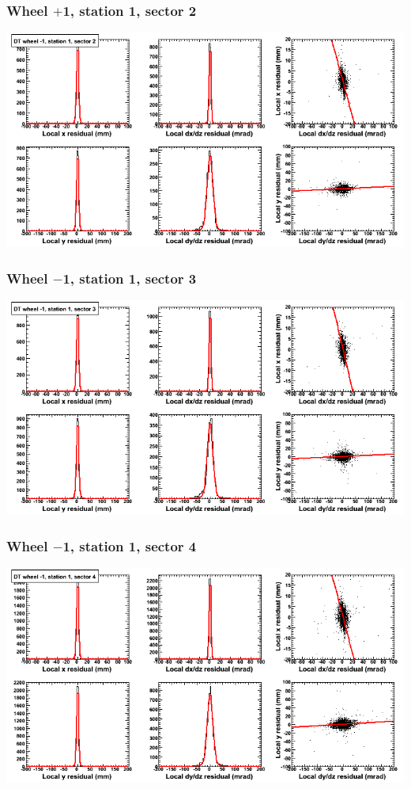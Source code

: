 \documentclass[compress]{beamer}
\begin{document}
\begin{frame}
\frametitle{Wheel $+$1, station 1, sector 2}
\includegraphics[width=\linewidth]{tmpbell_MBwhBst1sec02.png}
\end{frame}

\begin{frame}
\frametitle{Wheel $-$1, station 1, sector 3}
\includegraphics[width=\linewidth]{tmpbell_MBwhBst1sec03.png}
\end{frame}

\begin{frame}
\frametitle{Wheel $-$1, station 1, sector 4}
\includegraphics[width=\linewidth]{tmpbell_MBwhBst1sec04.png}
\end{frame}
\end{document}
